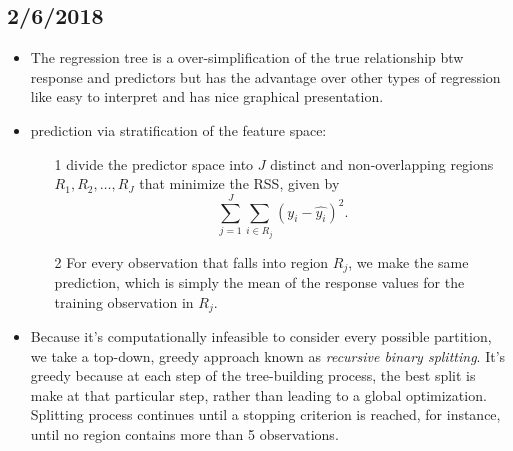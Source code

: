 \documentclass[a4paper, 12pt]{article}
\begin{document}
\subsection{2/6/2018}
\begin{itemize}
	\item The regression tree is a over-simplification of the true relationship btw response and predictors but has the advantage over other types of regression like easy to interpret and has nice graphical presentation.
	\item prediction via stratification of the feature space: 
	\begin{itemize}
		\item[1] divide the predictor space into $J$ distinct and non-overlapping regions $R_1,R_2,\ldots,R_J$ that minimize the RSS, given by
		\[
		\sum_{j=1}^{J}\sum_{i\in R_j}(y_i-\hat{y_i})^2.
		\]
		\item[2] For every observation that falls into region $R_j$, we make the same prediction, which is simply the mean of the response values for the training observation in $R_j$.
	\end{itemize}
	\item Because it's computationally infeasible to consider every possible partition, we take a top-down, greedy approach known as  \textit{recursive binary splitting}. It's greedy because at each step of the tree-building process, the best split is make at that particular step, rather than leading to a global optimization. Splitting process continues until a stopping criterion is reached, for instance, until no region contains more than 5 observations.
	

\end{itemize}
\end{document}
